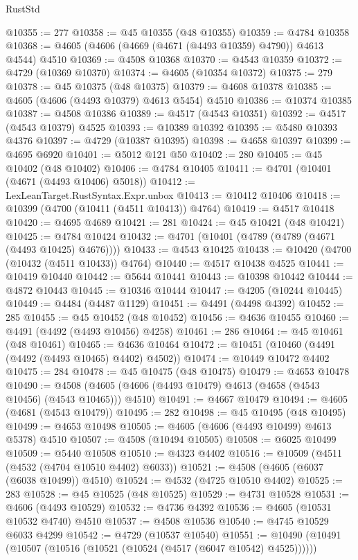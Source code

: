 \begin{lexlean}{RustStd}
\begin{coremodule}
@10355 := 277
@10358 := @45 @10355 (@48 @10355)
@10359 := @4784 @10358
@10368 := @4605 (@4606 (@4669 (@4671 (@4493 @10359) @4790)) @4613 @4544) @4510
@10369 := @4508 @10368
@10370 := @4543 @10359
@10372 := @4729 (@10369 @10370)
@10374 := @4605 (@10354 @10372)
@10375 := 279
@10378 := @45 @10375 (@48 @10375)
@10379 := @4608 @10378
@10385 := @4605 (@4606 (@4493 @10379) @4613 @5454) @4510
@10386 := @10374 @10385
@10387 := @4508 @10386
@10389 := @4517 (@4543 @10351)
@10392 := @4517 (@4543 @10379) @4525
@10393 := @10389 @10392
@10395 := @5480 @10393 @4376
@10397 := @4729 (@10387 @10395)
@10398 := @4658 @10397
@10399 := @4695 @6920
@10401 := @5012 @121 @50
@10402 := 280
@10405 := @45 @10402 (@48 @10402)
@10406 := @4784 @10405
@10411 := @4701 (@10401 (@4671 (@4493 @10406) @5018))
@10412 := LexLeanTarget.RustSyntax.Expr.unbox
@10413 := @10412 @10406
@10418 := @10399 (@4700 (@10411 (@4511 @10413)) @4764)
@10419 := @4517 @10418
@10420 := @4695 @4689
@10421 := 281
@10424 := @45 @10421 (@48 @10421)
@10425 := @4784 @10424
@10432 := @4701 (@10401 (@4789 (@4789 (@4671 (@4493 @10425) @4676))))
@10433 := @4543 @10425
@10438 := @10420 (@4700 (@10432 (@4511 @10433)) @4764)
@10440 := @4517 @10438 @4525
@10441 := @10419 @10440
@10442 := @5644 @10441
@10443 := @10398 @10442
@10444 := @4872 @10443
@10445 := @10346 @10444
@10447 := @4205 (@10244 @10445)
@10449 := @4484 (@4487 @1129)
@10451 := @4491 (@4498 @4392)
@10452 := 285
@10455 := @45 @10452 (@48 @10452)
@10456 := @4636 @10455
@10460 := @4491 (@4492 (@4493 @10456) @4258)
@10461 := 286
@10464 := @45 @10461 (@48 @10461)
@10465 := @4636 @10464
@10472 := @10451 (@10460 (@4491 (@4492 (@4493 @10465) @4402) @4502))
@10474 := @10449 @10472 @4402
@10475 := 284
@10478 := @45 @10475 (@48 @10475)
@10479 := @4653 @10478
@10490 := @4508 (@4605 (@4606 (@4493 @10479) @4613 (@4658 (@4543 @10456) (@4543 @10465))) @4510)
@10491 := @4667 @10479
@10494 := @4605 (@4681 (@4543 @10479))
@10495 := 282
@10498 := @45 @10495 (@48 @10495)
@10499 := @4653 @10498
@10505 := @4605 (@4606 (@4493 @10499) @4613 @5378) @4510
@10507 := @4508 (@10494 @10505)
@10508 := @6025 @10499
@10509 := @5440 @10508
@10510 := @4323 @4402
@10516 := @10509 (@4511 (@4532 (@4704 @10510 @4402) @6033))
@10521 := @4508 (@4605 (@6037 (@6038 @10499)) @4510)
@10524 := @4532 (@4725 @10510 @4402)
@10525 := 283
@10528 := @45 @10525 (@48 @10525)
@10529 := @4731 @10528
@10531 := @4606 (@4493 @10529)
@10532 := @4736 @4392
@10536 := @4605 (@10531 @10532 @4740) @4510
@10537 := @4508 @10536
@10540 := @4745 @10529 @6033 @4299
@10542 := @4729 (@10537 @10540)
@10551 := @10490 (@10491 (@10507 (@10516 (@10521 (@10524 (@4517 (@6047 @10542) @4525))))))

\end{coremodule}
\end{lexlean}
